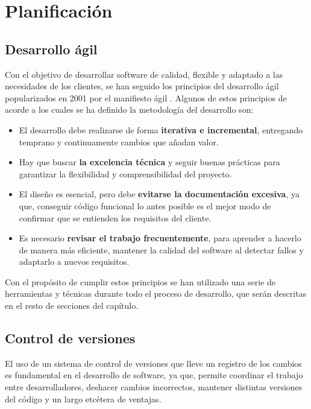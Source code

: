 \chapter{Planificación}

\section{Desarrollo ágil}


Con el objetivo de desarrollar software de calidad, flexible y adaptado a las necesidades de los clientes, se han seguido los principios del desarrollo ágil popularizados en 2001 por el manifiesto ágil \cite{beck2001agile}. Algunos de estos principios de acorde a los cuales se ha definido la metodología del desarrollo son:

\begin{itemize}
	\item{El desarrollo debe realizarse de forma \textbf{iterativa e incremental}, entregando temprano y continuamente cambios que añadan valor.}
	\item{Hay que buscar \textbf{la excelencia técnica} y seguir buenas prácticas para garantizar la flexibilidad y comprensibilidad del proyecto.}
	\item{El diseño es esencial, pero debe \textbf{evitarse la documentación excesiva}, ya que, conseguir código funcional lo antes posible es el mejor modo de confirmar que se entienden los requisitos del cliente.}
	\item{Es necesario \textbf{revisar el trabajo frecuentemente}, para aprender a hacerlo de manera más eficiente, mantener la calidad del software al detectar fallos y adaptarlo a nuevos requisitos.}
\end{itemize}

Con el propósito de cumplir estos principios se han utilizado una serie de herramientas y técnicas durante todo el proceso de desarrollo, que serán descritas en el resto de secciones del capítulo.

\section{Control de versiones}

El uso de un sistema de control de versiones que lleve un registro de los cambios es fundamental en el desarrollo de software, ya que, permite coordinar el trabajo entre desarrolladores, deshacer cambios incorrectos, mantener distintas versiones del código y un largo etcétera de ventajas.

